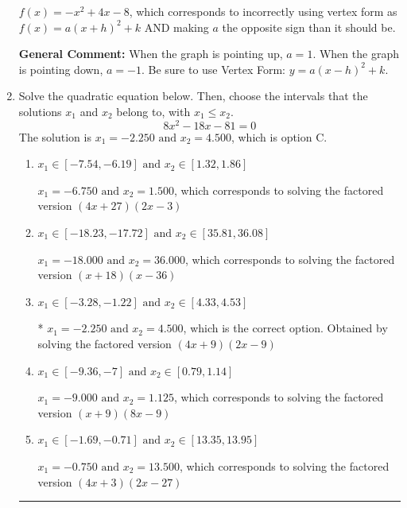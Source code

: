 \documentclass{extbook}[14pt]
\newcommand{\litem}[1]{\item #1

\rule{\textwidth}{0.4pt}}
\begin{document}
\begin{enumerate}
{\begin{enumerate}[label=\Alph*.]
$f(x)=-x^{2} +4 x -8$, which corresponds to incorrectly using vertex form as $f(x) = a(x+h)^2+k$ AND making $a$ the opposite sign than it should be.
\end{enumerate}

\textbf{General Comment:} When the graph is pointing up, $a=1$. When the graph is pointing down, $a=-1$. Be sure to use Vertex Form: $y = a(x-h)^2+k$.
}
\litem{
Solve the quadratic equation below. Then, choose the intervals that the solutions $x_1$ and $x_2$ belong to, with $x_1 \leq x_2$.
\[ 8x^{2} -18 x -81 = 0 \]
The solution is \( x_1 = -2.250 \text{ and } x_2 = 4.500 \), which is option C.\begin{enumerate}[label=\Alph*.]
\item \( x_1 \in [-7.54, -6.19] \text{ and } x_2 \in [1.32, 1.86] \)

$x_1 = -6.750 \text{ and } x_2 = 1.500$, which corresponds to solving the factored version $(4x + 27)(2x -3)$
\item \( x_1 \in [-18.23, -17.72] \text{ and } x_2 \in [35.81, 36.08] \)

$x_1 = -18.000 \text{ and } x_2 = 36.000$, which corresponds to solving the factored version $(x + 18)(x -36)$
\item \( x_1 \in [-3.28, -1.22] \text{ and } x_2 \in [4.33, 4.53] \)

* $x_1 = -2.250 \text{ and } x_2 = 4.500$, which is the correct option. Obtained by solving the factored version $(4x + 9)(2x -9)$
\item \( x_1 \in [-9.36, -7] \text{ and } x_2 \in [0.79, 1.14] \)

$x_1 = -9.000 \text{ and } x_2 = 1.125$, which corresponds to solving the factored version $(x + 9)(8x -9)$
\item \( x_1 \in [-1.69, -0.71] \text{ and } x_2 \in [13.35, 13.95] \)

$x_1 = -0.750 \text{ and } x_2 = 13.500$, which corresponds to solving the factored version $(4x + 3)(2x -27)$
\end{enumerate}

}
\end{enumerate}
\end{document}
